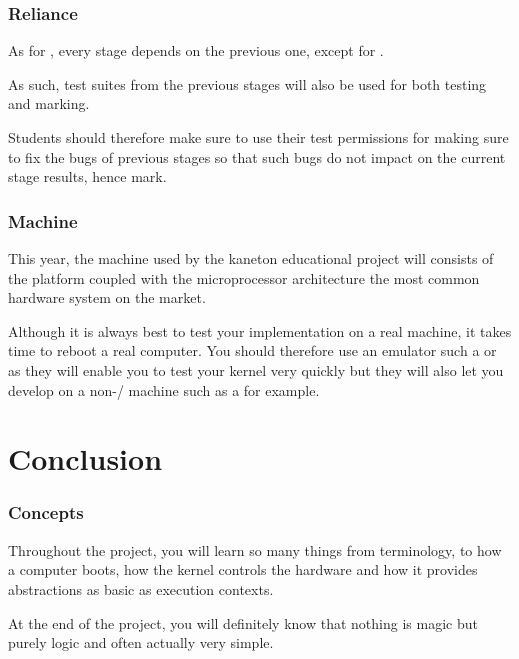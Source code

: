 
\begin{frame}
  \frametitle{Reliance}

  As for , every stage depends on the previous one, except
  for .

  \-

  As such, test suites from the previous stages will also be used for both
  testing and marking.

  \-

  Students should therefore make sure to use their test permissions for making
  sure to fix the bugs of previous stages so that such bugs do not impact
  on the current stage results, hence mark.
\end{frame}


\begin{frame}
  \frametitle{Machine}

  This year, the machine used by the kaneton educational project will consists
  of the  platform coupled with the  microprocessor
  architecture \ie{} the most common hardware system on the market.

  \-

  Although it is always best to test your implementation on a real machine,
  it takes time to reboot a real computer. You should therefore use an
  emulator such a  or  as they will enable you to
  test your kernel very quickly but they will also let you develop on
  a non-/ machine such as a  for example.
\end{frame}

%
%

\section{Conclusion}


\begin{frame}
  \frametitle{Concepts}

  Throughout the project, you will learn so many things from terminology,
  to how a computer boots, how the kernel controls the hardware and how it
  provides abstractions as basic as execution contexts.

  \-

  At the end of the project, you will definitely know that nothing is magic
  but purely logic and often actually very simple.
\end{frame}

